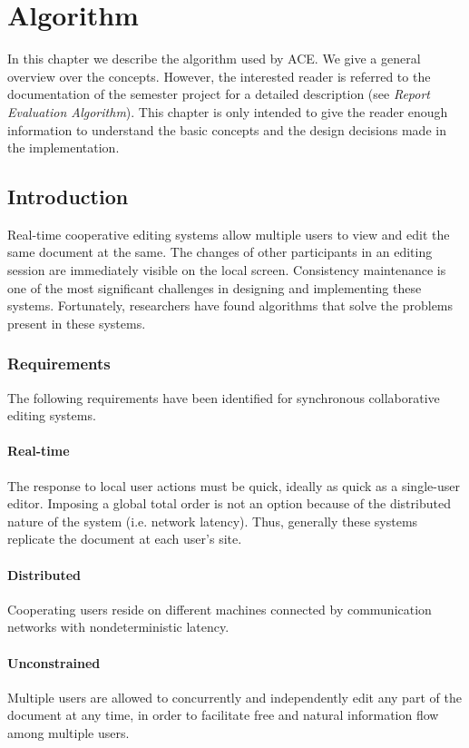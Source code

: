 \chapter{Algorithm}

In this chapter we describe the algorithm used by ACE. We give a general
overview over the concepts. However, the interested reader is referred to
the documentation of the semester project for a detailed description (see 
\emph{Report Evaluation Algorithm}). This chapter is only intended to give
the reader enough information to understand the basic concepts and the
design decisions made in the implementation.



\section{Introduction}
Real-time cooperative editing systems allow multiple users to view and edit the 
same document at the same. The changes of other participants in an editing
session are immediately visible on the local screen. Consistency maintenance
is one of the most significant challenges in designing and implementing
these systems. Fortunately, researchers have found algorithms that solve the
problems present in these systems.


\subsection{Requirements}
The following requirements have been identified for synchronous collaborative
editing systems.

\subsubsection{Real-time} 
The response to local user actions must be quick, ideally
as quick as a single-user editor. Imposing a global total order is not
an option because of the distributed nature of the system (i.e. network
latency). Thus, generally these systems replicate the document at each
user's site.

\subsubsection{Distributed} 
Cooperating users reside on different machines 
connected by communication networks with nondeterministic latency.

\subsubsection{Unconstrained} 
Multiple users are allowed to concurrently and
independently edit any part of the document at any time, in order to 
facilitate free and natural information flow among multiple users.


